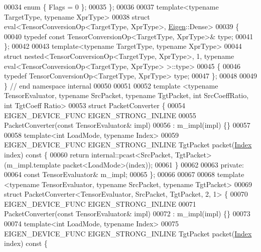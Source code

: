 \begin{DoxyCode}
00034   \textcolor{keyword}{enum} \{ Flags = 0 \};
00035 \};
00036 
00037 \textcolor{keyword}{template}<\textcolor{keyword}{typename} TargetType, \textcolor{keyword}{typename} XprType>
00038 \textcolor{keyword}{struct }eval<TensorConversionOp<TargetType, XprType>, \hyperlink{namespace_eigen}{Eigen}::Dense>
00039 \{
00040   \textcolor{keyword}{typedef} \textcolor{keyword}{const} TensorConversionOp<TargetType, XprType>& type;
00041 \};
00042 
00043 \textcolor{keyword}{template}<\textcolor{keyword}{typename} TargetType, \textcolor{keyword}{typename} XprType>
00044 \textcolor{keyword}{struct }nested<TensorConversionOp<TargetType, XprType>, 1, typename eval<TensorConversionOp<TargetType, 
      XprType> >::type>
00045 \{
00046   \textcolor{keyword}{typedef} TensorConversionOp<TargetType, XprType> type;
00047 \};
00048 
00049 \}  \textcolor{comment}{// end namespace internal}
00050 
00051 
00052 \textcolor{keyword}{template} <\textcolor{keyword}{typename} TensorEvaluator, \textcolor{keyword}{typename} SrcPacket, \textcolor{keyword}{typename} TgtPacket, \textcolor{keywordtype}{int} SrcCoeffRatio, \textcolor{keywordtype}{int} TgtCoeff
      Ratio>
00053 \textcolor{keyword}{struct }PacketConverter \{
00054   EIGEN\_DEVICE\_FUNC EIGEN\_STRONG\_INLINE
00055   PacketConverter(\textcolor{keyword}{const} TensorEvaluator& impl)
00056       : m\_impl(impl) \{\}
00057 
00058   \textcolor{keyword}{template}<\textcolor{keywordtype}{int} LoadMode, \textcolor{keyword}{typename} Index>
00059   EIGEN\_DEVICE\_FUNC EIGEN\_STRONG\_INLINE TgtPacket packet(\hyperlink{namespace_eigen_a62e77e0933482dafde8fe197d9a2cfde}{Index} index)\textcolor{keyword}{ const }\{
00060     \textcolor{keywordflow}{return} internal::pcast<SrcPacket, TgtPacket>(m\_impl.template packet<LoadMode>(index));
00061   \}
00062 
00063  \textcolor{keyword}{private}:
00064   \textcolor{keyword}{const} TensorEvaluator& m\_impl;
00065 \};
00066 
00067 
00068 \textcolor{keyword}{template} <\textcolor{keyword}{typename} TensorEvaluator, \textcolor{keyword}{typename} SrcPacket, \textcolor{keyword}{typename} TgtPacket>
00069 \textcolor{keyword}{struct }PacketConverter<TensorEvaluator, SrcPacket, TgtPacket, 2, 1> \{
00070   EIGEN\_DEVICE\_FUNC EIGEN\_STRONG\_INLINE
00071   PacketConverter(\textcolor{keyword}{const} TensorEvaluator& impl)
00072       : m\_impl(impl) \{\}
00073 
00074   \textcolor{keyword}{template}<\textcolor{keywordtype}{int} LoadMode, \textcolor{keyword}{typename} Index>
00075   EIGEN\_DEVICE\_FUNC EIGEN\_STRONG\_INLINE TgtPacket packet(\hyperlink{namespace_eigen_a62e77e0933482dafde8fe197d9a2cfde}{Index} index)\textcolor{keyword}{ const }\{

\end{DoxyCode}
